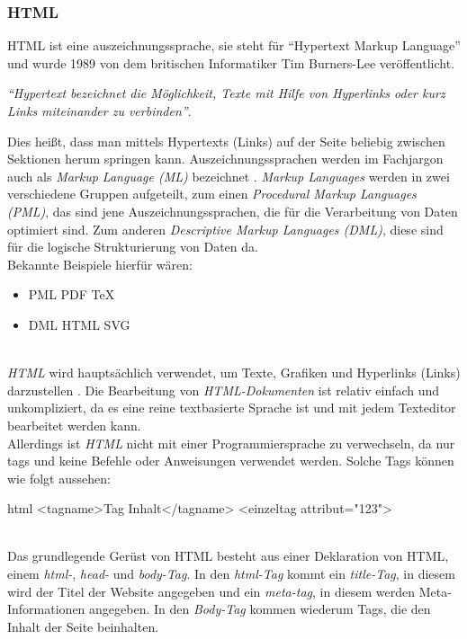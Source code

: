 		\subsubsection{HTML}
		\label{chapter:study-frontend-html}
		HTML ist eine \Gls{auszeichnungssprache}, sie steht für \enquote{Hypertext Markup Language} und wurde 1989 von dem britischen Informatiker Tim Burners-Lee veröffentlicht.\\ 
		\begin{center}
			\textit{\enquote{Hypertext bezeichnet die Möglichkeit, Texte mit Hilfe von Hyperlinks oder kurz Links miteinander zu verbinden}}\cite{html5-css3-def}.
		\end{center}
		Dies heißt, dass man mittels Hypertexts (Links) auf der Seite beliebig zwischen Sektionen herum springen kann.
		Auszeichnungssprachen werden im Fachjargon auch als \textit{Markup Language (ML)} bezeichnet \cite{auszeichnungssprachen}. \textit{Markup Languages} werden in zwei verschiedene Gruppen aufgeteilt, zum einen \textit{Procedural Markup Languages (PML)}, das sind jene Auszeichnungssprachen, die für die Verarbeitung von Daten optimiert sind. Zum anderen \textit{Descriptive Markup Languages (DML)}, diese sind für die logische Strukturierung von Daten da.\\Bekannte Beispiele hierfür wären:
		\begin{itemize}
		\item PML
		\subitem PDF
		\subitem TeX
		\item DML
		\subitem HTML
		\subitem SVG
		\end{itemize}
	\label{list:dmlbsp}~\\
		\textit{HTML} wird hauptsächlich verwendet, um Texte, Grafiken und Hyperlinks (Links) darzustellen \cite{html5-css3-handbuch, html5-css3-def}. Die Bearbeitung von \textit{HTML-Dokumenten} ist relativ einfach und unkompliziert, da es eine reine textbasierte Sprache ist und mit jedem Texteditor bearbeitet werden kann.\\
		Allerdings ist \textit{HTML} nicht mit einer Programmiersprache zu verwechseln, da nur \Gls{tag}s und keine Befehle oder Anweisungen verwendet werden. Solche Tags können wie folgt aussehen:
		\begin{code}{html}
			<tagname>Tag Inhalt</tagname>
			<einzeltag attribut="123">
		\end{code}
	\label{list:htmltags} ~\\
		Das grundlegende Gerüst von HTML besteht aus einer Deklaration von HTML, einem \textit{html-}, \textit{head-} und \textit{body-Tag}. In den \textit{html-Tag} kommt ein \textit{title-Tag}, in diesem wird der Titel der Website angegeben und ein \textit{meta-tag}, in diesem werden Meta-Informationen angegeben. In den \textit{Body-Tag} kommen wiederum Tags, die den Inhalt der Seite beinhalten. 
